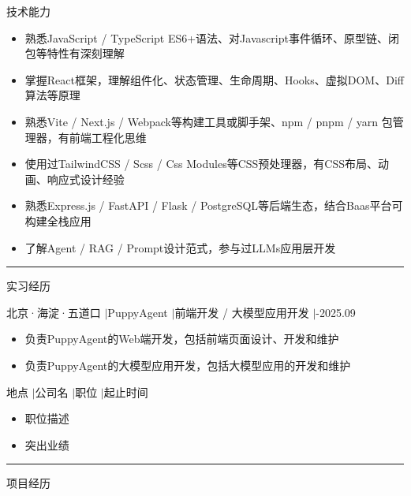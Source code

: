 \documentclass[11pt,a4paper]{ctexart}
\begin{document}
{\heiti 技术能力}
\begin{itemize}[itemsep=0pt,parsep=0pt,topsep=0pt]
    \item {\songti 熟悉JavaScript / TypeScript ES6+语法、对Javascript事件循环、原型链、闭包等特性有深刻理解}
    \item {\songti 掌握React框架，理解组件化、状态管理、生命周期、Hooks、虚拟DOM、Diff算法等原理}
    \item {\songti 熟悉Vite / Next.js / Webpack等构建工具或脚手架、npm / pnpm / yarn 包管理器，有前端工程化思维}
    \item {\songti 使用过TailwindCSS / Scss / Css Modules等CSS预处理器，有CSS布局、动画、响应式设计经验}
    \item {\songti 熟悉Express.js / FastAPI / Flask / PostgreSQL等后端生态，结合Baas平台可构建全栈应用}
    \item {\songti 了解Agent / RAG / Prompt设计范式，参与过LLMs应用层开发}
\end{itemize}

\vspace{1em}
\hrule
\vspace{1em}

{\heiti 实习经历}

{\heiti 北京·海淀·五道口 \quad$|$\quad PuppyAgent \quad$|$\quad 前端开发 / 大模型应用开发 \quad$|$-2025.09}

\begin{itemize}[itemsep=0pt,parsep=0pt,topsep=0pt]
    \item 负责PuppyAgent的Web端开发，包括前端页面设计、开发和维护
    \item 负责PuppyAgent的大模型应用开发，包括大模型应用的开发和维护
\end{itemize}

{\heiti 地点 \quad$|$\quad 公司名 \quad$|$\quad 职位 \quad$|$\quad 起止时间}

\begin{itemize}[itemsep=0pt,parsep=0pt,topsep=0pt]
    \item 职位描述
    \item 突出业绩
\end{itemize}

\vspace{1em}
\hrule
\vspace{1em}

{\heiti 项目经历}
\end{document}
